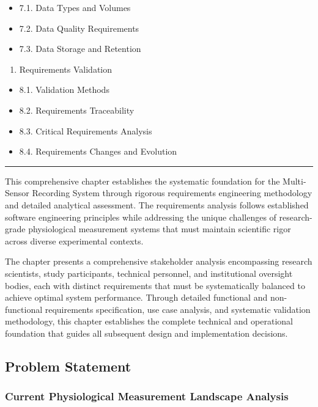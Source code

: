 \documentclass[11pt,a4paper]{report}
\begin{document}
\begin{itemize}
\item 7.1. Data Types and Volumes
\item 7.2. Data Quality Requirements
\item 7.3. Data Storage and Retention
\end{itemize}
\begin{enumerate}
\item Requirements Validation
\end{enumerate}
\begin{itemize}
\item 8.1. Validation Methods
\item 8.2. Requirements Traceability
\item 8.3. Critical Requirements Analysis
\item 8.4. Requirements Changes and Evolution

\end{itemize}
\hrule

This comprehensive chapter establishes the systematic foundation for the Multi-Sensor Recording System through rigorous
requirements engineering methodology and detailed analytical assessment. The requirements analysis follows established
software engineering principles while addressing the unique challenges of research-grade physiological measurement
systems that must maintain scientific rigor across diverse experimental contexts.

The chapter presents a comprehensive stakeholder analysis encompassing research scientists, study participants,
technical personnel, and institutional oversight bodies, each with distinct requirements that must be systematically
balanced to achieve optimal system performance. Through detailed functional and non-functional requirements
specification, use case analysis, and systematic validation methodology, this chapter establishes the complete technical
and operational foundation that guides all subsequent design and implementation decisions.

\subsection{Problem Statement}

\subsubsection{Current Physiological Measurement Landscape Analysis}
\end{document}
